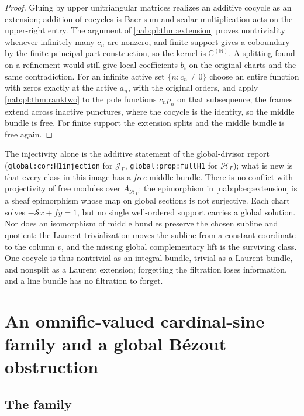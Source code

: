 \documentclass[11pt,letterpaper]{article}
\theoremstyle{definition}
\theoremstyle{remark}
\newcommand{\C}{\mathbb C}
\newcommand{\N}{\mathbb N}
\newcommand{\HH}{\mathscr H_\Gamma}
\newcommand{\JJ}{\mathscr J_\Gamma}
\numberwithin{equation}{section}
\begin{document}
\begin{proof}
Gluing by upper unitriangular matrices realizes an additive cocycle as an
extension; addition of cocycles is Baer sum and scalar multiplication acts on
the upper-right entry. The argument of \cref{nab:pl:thm:extension} proves
nontriviality whenever infinitely many $c_n$ are nonzero, and finite support
gives a coboundary by the finite principal-part construction, so the kernel is
$\C^{(\N)}$. A splitting found on a refinement would still give local
coefficients $b_i$ on the original charts and the same contradiction. For an
infinite active set $\{n:c_n\neq0\}$ choose an entire function with zeros
exactly at the active $a_n$, with the original orders, and apply
\cref{nab:pl:thm:ranktwo} to the pole functions $c_np_n$ on that subsequence;
the frames extend across inactive punctures, where the cocycle is the
identity, so the middle bundle is free. For finite support the extension
splits and the middle bundle is free again.
\end{proof}

The injectivity alone is the additive statement of the global-divisor report
(\nolinkurl{global:cor:H1injection} for $\JJ$, \nolinkurl{global:prop:fullH1} for
$\HH$); what is new is that every class in this image has a \emph{free} middle
bundle. There is no conflict with projectivity of free modules over $A_{\HH}$:
the epimorphism in \eqref{nab:pl:eq:extension} is a sheaf epimorphism whose map
on global sections is not surjective. Each chart solves $-\mathcal Sx+fy=1$,
but no single well-ordered support carries a global solution. Nor does an
isomorphism of middle bundles preserve the chosen subline and quotient: the
Laurent trivialization moves the subline from a constant coordinate to the
column $v$, and the missing global complementary lift is the surviving class.
One cocycle is thus nontrivial as an integral bundle, trivial as a Laurent
bundle, and nonsplit as a Laurent extension; forgetting the filtration loses
information, and a line bundle has no filtration to forget.

\section{An omnific-valued cardinal-sine family and a global B\'ezout
obstruction}\label{nab:pl:sec:omnific}

\subsection{The family}
\end{document}
